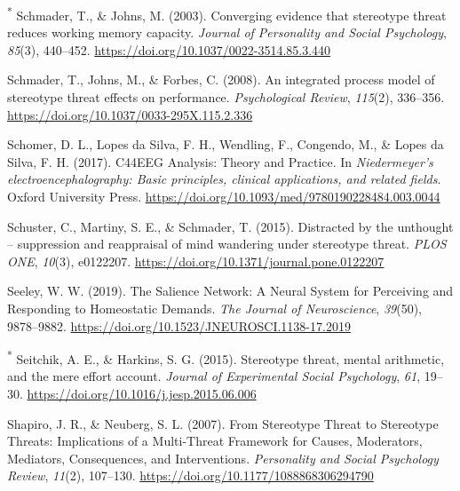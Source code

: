 \documentclass[
  stu, a4paper,floatsintext]{apa7}
\newlength{\cslhangindent}
\newenvironment{CSLReferences}[2] %
 {\begin{list}{}{%
  \setlength{\itemindent}{0pt}
  \setlength{\leftmargin}{0pt}
  \setlength{\parsep}{0pt}
  \ifodd #1
   \setlength{\leftmargin}{\cslhangindent}
   \setlength{\itemindent}{-1\cslhangindent}
  \fi
  \setlength{\itemsep}{#2\baselineskip}}}
 {\end{list}}
\begin{document}
\begin{CSLReferences}{1}{0}
\textsuperscript{*} Schmader, T., \& Johns, M. (2003). Converging evidence that stereotype threat reduces working memory capacity. \emph{Journal of Personality and Social Psychology}, \emph{85}(3), 440--452. \url{https://doi.org/10.1037/0022-3514.85.3.440}

Schmader, T., Johns, M., \& Forbes, C. (2008). An integrated process model of stereotype threat effects on performance. \emph{Psychological Review}, \emph{115}(2), 336--356. \url{https://doi.org/10.1037/0033-295X.115.2.336}

Schomer, D. L., Lopes da Silva, F. H., Wendling, F., Congendo, M., \& Lopes da Silva, F. H. (2017). {C44EEG Analysis}: {Theory} and {Practice}. In \emph{Niedermeyer's electroencephalography: {Basic} principles, clinical applications, and related fields}. Oxford University Press. \url{https://doi.org/10.1093/med/9780190228484.003.0044}

Schuster, C., Martiny, S. E., \& Schmader, T. (2015). Distracted by the unthought -- suppression and reappraisal of mind wandering under stereotype threat. \emph{PLOS ONE}, \emph{10}(3), e0122207. \url{https://doi.org/10.1371/journal.pone.0122207}

Seeley, W. W. (2019). The {Salience Network}: {A Neural System} for {Perceiving} and {Responding} to {Homeostatic Demands}. \emph{The Journal of Neuroscience}, \emph{39}(50), 9878--9882. \url{https://doi.org/10.1523/JNEUROSCI.1138-17.2019}

\textsuperscript{*} Seitchik, A. E., \& Harkins, S. G. (2015). Stereotype threat, mental arithmetic, and the mere effort account. \emph{Journal of Experimental Social Psychology}, \emph{61}, 19--30. \url{https://doi.org/10.1016/j.jesp.2015.06.006}

Shapiro, J. R., \& Neuberg, S. L. (2007). From {Stereotype Threat} to {Stereotype Threats}: {Implications} of a {Multi-Threat Framework} for {Causes}, {Moderators}, {Mediators}, {Consequences}, and {Interventions}. \emph{Personality and Social Psychology Review}, \emph{11}(2), 107--130. \url{https://doi.org/10.1177/1088868306294790}


\end{CSLReferences}
\end{document}
